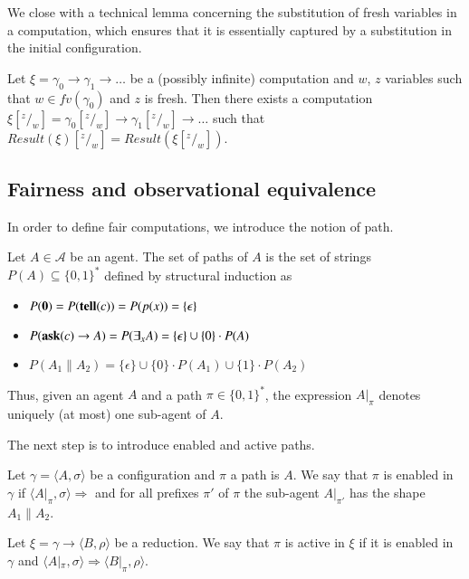 \documentclass[main.tex]{subfiles}
\begin{document}
We close with a technical lemma concerning the substitution of fresh variables in a computation, which ensures that it is essentially captured by a substitution in the initial configuration.

\begin{lemma}\label{lem:SubComp}
Let $\xi = \gamma_0  \rightarrow \gamma_1  \rightarrow \dots$ be a (possibly infinite)
computation and $w$, $z$ variables such that $w \in fv(\gamma_0)$ and $z$ is fresh.
Then there exists a computation 
$\xi [^z/_w] = \gamma_0 [^z/_w]   \rightarrow \gamma_1 [^z/_w]  \rightarrow \dots$ 
such that $\mathit{Result}(\xi) [^z/_w] = \mathit{Result}(\xi [^z/_w])$.
\end{lemma}

\subsection{Fairness and observational equivalence}
In order to define fair computations, we introduce the notion of path.

\begin{definition}[Paths]
Let $A  \in \mathcal{A}$ be an agent. The set of paths of $A$ is the set of strings 
$P(A) \subseteq {\{0, 1\}^*}$ defined by structural induction as 
\begin{itemize}
\item $P({\mathbf 0}) = P({\bf tell}(c)) = P(p(x)) = \{\epsilon\}$
\item $P({\bf ask}(c) \rightarrow A) = P(\exists_x A) = \{\epsilon\} \cup  \{0\} \cdot P(A)$
\item $P(A_1 \parallel A_2) = \{\epsilon\} \cup  \{0\} \cdot P(A_1) \cup  \{1\} \cdot P(A_2)$
\end{itemize}
\end{definition}

Thus, given an agent $A$ and a path  $\pi \in \{0, 1\}^*$, the expression $A|_\pi$ denotes uniquely (at most) one sub-agent of $A$.

The next step is to introduce enabled and active paths.

\begin{definition}
Let $\gamma = \langle A, \sigma \rangle$ be a configuration and $\pi$ a path is $A$. 
%
We say that $\pi$ is enabled in $\gamma$ if 
$\langle A|_\pi, \sigma \rangle \Rightarrow$ and
for all prefixes $\pi'$ of $\pi$ the sub-agent $A|_{\pi'}$ has the shape
$A_1 \parallel A_2$.

Let $\xi = \gamma \rightarrow \langle B, \rho \rangle$ be a reduction. 
We say that $\pi$ is active in $\xi$ if it is enabled in $\gamma$
and  $\langle A|_\pi, \sigma \rangle  \Rightarrow \langle B|_\pi, \rho \rangle$.
\end{definition}
\end{document}
